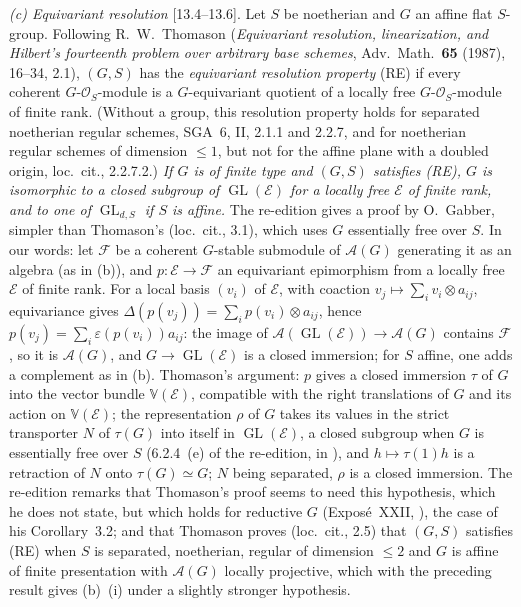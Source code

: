 \par\smallskip\noindent\textit{(c) Equivariant resolution} [13.4--13.6]. Let \(S\) be
noetherian and \(G\) an affine flat \(S\)-group. Following R.~W.~Thomason (\emph{Equivariant
resolution, linearization, and Hilbert's fourteenth problem over arbitrary base schemes},
Adv.\ Math.\ \textbf{65} (1987), 16--34, 2.1), \((G,S)\) has the \emph{equivariant resolution
property} \textup{(RE)} if every coherent \(G\)-\(\mathcal O_S\)-module is a \(G\)-equivariant
quotient of a locally free \(G\)-\(\mathcal O_S\)-module of finite rank. (Without a group, this
resolution property holds for separated noetherian regular schemes, SGA~6, II, 2.1.1 and
2.2.7, and for noetherian regular schemes of dimension \(\leq1\), but not for the affine plane
with a doubled origin, loc.\ cit., 2.2.7.2.) \emph{If \(G\) is of finite type and \((G,S)\)
satisfies \textup{(RE)}, \(G\) is isomorphic to a closed subgroup of
\(\operatorname{GL}(\mathcal E)\) for a locally free \(\mathcal E\) of finite rank, and to one
of \(\operatorname{GL}_{d,S}\) if \(S\) is affine.} The re-edition gives a proof by O.~Gabber,
simpler than Thomason's (loc.\ cit., 3.1), which uses \(G\) essentially free over \(S\). In our
words: let \(\mathcal F\) be a coherent \(G\)-stable submodule of \(\mathcal A(G)\) generating it
as an algebra (as in (b)), and \(p:\mathcal E\to\mathcal F\) an equivariant epimorphism from a
locally free \(\mathcal E\) of finite rank. For a local basis \((v_i)\) of \(\mathcal E\), with
coaction \(v_j\mapsto\sum_iv_i\otimes a_{ij}\), equivariance gives
\(\Delta(p(v_j))=\sum_ip(v_i)\otimes a_{ij}\), hence
\(p(v_j)=\sum_i\varepsilon(p(v_i))a_{ij}\): the image of
\(\mathcal A(\operatorname{GL}(\mathcal E))\to\mathcal A(G)\) contains \(\mathcal F\), so it is
\(\mathcal A(G)\), and \(G\to\operatorname{GL}(\mathcal E)\) is a closed immersion; for \(S\)
affine, one adds a complement as in (b). Thomason's argument: \(p\) gives a closed immersion
\(\tau\) of \(G\) into the vector bundle \(\mathbb V(\mathcal E)\), compatible with the right
translations of \(G\) and its action on \(\mathbb V(\mathcal E)\); the representation \(\rho\)
of \(G\) takes its values in the strict transporter \(N\) of \(\tau(G)\) into itself in
\(\operatorname{GL}(\mathcal E)\), a closed subgroup when \(G\) is essentially free over \(S\)
(6.2.4~(e) of the re-edition, in ),
and \(h\mapsto\tau(1)h\) is a retraction of \(N\) onto \(\tau(G)\simeq G\); \(N\) being
separated, \(\rho\) is a closed immersion. The re-edition remarks that Thomason's proof seems to
need this hypothesis, which he does not state, but which holds for reductive \(G\)
(Expos\'e~XXII, ), the case of his Corollary~3.2; and that
Thomason proves (loc.\ cit., 2.5) that \((G,S)\) satisfies \textup{(RE)} when \(S\) is
separated, noetherian, regular of dimension \(\leq2\) and \(G\) is affine of finite presentation
with \(\mathcal A(G)\) locally projective, which with the preceding result gives (b)~(i) under a
slightly stronger hypothesis.

